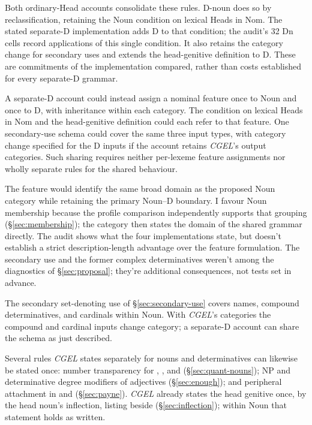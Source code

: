 \documentclass[12pt]{article}
\begin{document}
Both ordinary-Head accounts consolidate these rules. D-noun does so by reclassification, retaining the Noun condition on lexical Heads in Nom. The stated separate-D implementation adds D to that condition; the audit's 32 Dn cells record applications of this single condition. It also retains the category change for secondary uses and extends the head-genitive definition to D. These are commitments of the implementation compared, rather than costs established for every separate-D grammar.

A separate-D account could instead assign a nominal feature once to Noun and once to D, with inheritance within each category. The condition on lexical Heads in Nom and the head-genitive definition could each refer to that feature. One secondary-use schema could cover the same three input types, with category change specified for the D inputs if the account retains \textit{CGEL}'s output categories. Such sharing requires neither per-lexeme feature assignments nor wholly separate rules for the shared behaviour.

The feature would identify the same broad domain as the proposed Noun category while retaining the primary Noun--D boundary. I favour Noun membership because the profile comparison independently supports that grouping (§\ref{sec:membership}); the category then states the domain of the shared grammar directly. The audit shows what the four implementations state, but doesn't establish a strict description-length advantage over the feature formulation. The secondary use and the former complex determinatives weren't among the diagnostics of §\ref{sec:proposal}; they're additional consequences, not tests set in advance.

The secondary set-denoting use of §\ref{sec:secondary-use} covers names, compound determinatives, and cardinals within Noun. With \textit{CGEL}'s categories the compound and cardinal inputs change category; a separate-D account can share the schema as just described.

Several rules \textit{CGEL} states separately for nouns and determinatives can likewise be stated once: number transparency for , , and  (§\ref{sec:quant-nouns}); NP and determinative degree modifiers of adjectives (§\ref{sec:enough}); and peripheral attachment in  and  (§\ref{sec:payne}). \textit{CGEL} already states the head genitive once, by the head noun's inflection, listing  beside  (§\ref{sec:inflection}); within Noun that statement holds as written.
\end{document}
